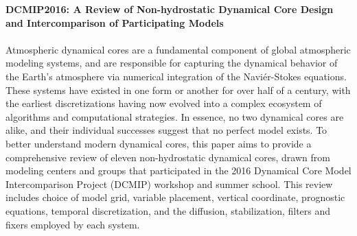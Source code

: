 \documentclass[11pt]{article}
\begin{document}
\noindent \textbf{DCMIP2016:  A Review of Non-hydrostatic Dynamical Core Design and Intercomparison of Participating Models} \\

 \\

\noindent Atmospheric dynamical cores are a fundamental component of global atmospheric modeling systems, and are responsible for capturing the dynamical behavior of the Earth's atmosphere via numerical integration of the Navi\'er-Stokes equations.  These systems have existed in one form or another for over half of a century, with the earliest discretizations having now evolved into a complex ecosystem of algorithms and computational strategies.  In essence, no two dynamical cores are alike, and their individual successes suggest that no perfect model exists.  To better understand modern dynamical cores, this paper aims to provide a comprehensive review of eleven non-hydrostatic dynamical cores, drawn from modeling centers and groups that participated in the 2016 Dynamical Core Model Intercomparison Project (DCMIP) workshop and summer school.  This review includes choice of model grid, variable placement, vertical coordinate, prognostic equations, temporal discretization, and the diffusion, stabilization, filters and fixers employed by each system.
\end{document}
